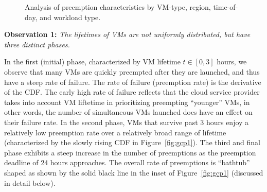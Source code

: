 \documentclass[sigconf]{acmart} %
\newcommand{\myfigspace}[0]{-0.45cm}
\begin{document}
\begin{figure}
  \hfill
{}
\hfill
{}
\vspace*{-0.6cm}
\caption{Analysis of preemption characteristics by VM-type, region, time-of-day, and workload type.}
\label{fig:breakdown-all}
    \vspace*{\myfigspace}
\end{figure}

\noindent \textbf{Observation 1:} \emph{The lifetimes of VMs are not uniformly distributed, but have three distinct phases.}

\noindent In the first (initial) phase, characterized by VM lifetime $t\in [0, 3]$ hours, we observe that many VMs are quickly preempted after they are launched, and thus have a steep rate of failure. The rate of failure (preemption rate) is the derivative of the CDF.
The early high rate of failure reflects that the cloud service provider takes into account VM liftetime in prioritizing preempting ``younger'' VMs, in other words, the number of simultaneous VMs launched does have an effect on their failure rate. 
In the second phase, VMs that survive past 3 hours enjoy a relatively low preemption rate over a relatively broad range of lifetime (characterized by the slowly rising CDF in Figure~\ref{fig:gcp1}).
The third and final phase exhibits a steep increase in the number of preemptions as the preemption deadline of 24 hours approaches.
The overall rate of preemptions is ``bathtub'' shaped as shown by the solid black line in the inset of Figure~\ref{fig:gcp1} (discussed in detail below).
\end{document}
